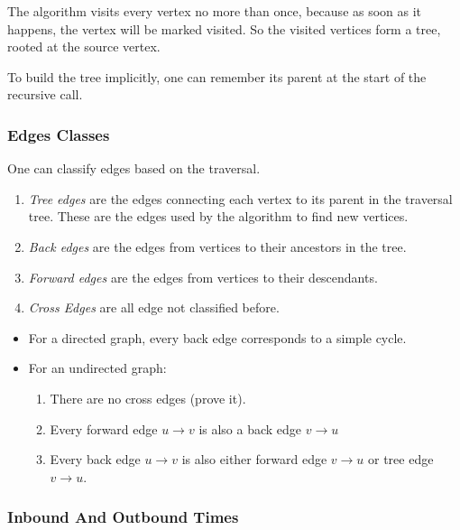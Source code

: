 \documentclass[a4paper,12pt]{article}
\begin{document}
      The algorithm visits every vertex no more than once, because as
      soon as it happens, the vertex will be marked visited.
      So the visited vertices form a tree, rooted at the source vertex.

      To build the tree implicitly, one can remember its parent at
      the start of the recursive call.

      \subsubsection{Edges Classes}

      One can classify edges based on the traversal.

      \begin{enumerate}
        \item \emph{Tree edges} are the edges connecting each vertex
          to its parent in the traversal tree. These are the edges
          used by the algorithm to find new vertices.
        \item \emph{Back edges} are the edges from vertices to their
          ancestors in the tree.
        \item \emph{Forward edges} are the edges from vertices to
          their descendants.
        \item \emph{Cross Edges} are all edge not classified before.
      \end{enumerate}

      \begin{itemize}
        \item For a directed graph, every back edge corresponds to
          a simple cycle.

        \item For an undirected graph:
          \begin{enumerate}
            \item There are no cross edges (prove it).
            \item Every forward edge $u \to v$ is also a back edge $v \to u$
            \item Every back edge $u \to v$ is also either
              forward edge $v \to u$ or tree edge $v \to u$.
          \end{enumerate}
      \end{itemize}

      \subsubsection{Inbound And Outbound Times}
\end{document}
